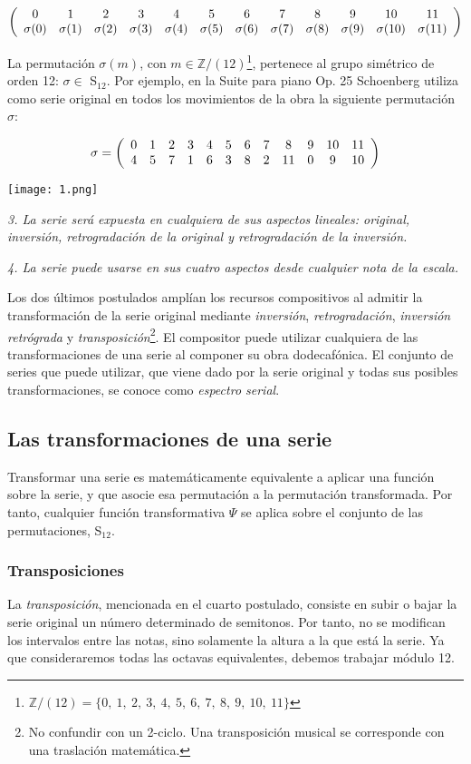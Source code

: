 		\[
			\drow{
				\sigma(0),\sigma(1),\sigma(2),\sigma(3),\sigma(4),\sigma(5),\sigma(6),\sigma(7),\sigma(8),\sigma(9),\sigma(10),\sigma(11)
			}
		\]
	
		La permutaci\'on $\sigma(m)$, con $m\in \mathbb{Z} / (12)$\footnote{$\mathbb{Z} / (12)=\{0,\ 1,\ 2,\ 3,\ 4,\ 5,\ 6,\ 7,\ 8,\ 9,\ 10,\ 11\}$}, pertenece al grupo sim\'etrico de orden 12: $\sigma\in$ S$_{12}$. Por ejemplo, en la Suite para piano Op. 25 Schoenberg utiliza como serie original en todos los movimientos de la obra la siguiente permutaci\'on $\sigma$:
		
		\[\sigma=\drow{4,5,7,1,6,3,8,2,11,0,9,10}\]	
		\begin{center}
			\texttt{[image: 1.png]}
		\end{center}
		
		\emph{3. La serie ser\'a expuesta en cualquiera de sus aspectos lineales: original, inversi\'on, retrogradaci\'on de la original y retrogradaci\'on de la inversi\'on.}
		 
		\emph{4. La serie puede usarse en sus cuatro aspectos desde cualquier nota de la escala.}
		
		Los dos \'ultimos postulados ampl\'ian los recursos compositivos al admitir la transformaci\'on de la serie original mediante \emph{inversi\'on}, \emph{retrogradaci\'on}, \emph{inversi\'on retr\'ograda} y \emph{transposici\'on}\footnote{No confundir con un 2-ciclo. Una transposici\'on musical se corresponde con una traslaci\'on matem\'atica.}. El compositor puede utilizar cualquiera de las transformaciones de una serie al componer su obra dodecaf\'onica. El conjunto de series que puede utilizar, que viene dado por la serie original y todas sus posibles transformaciones, se conoce como \emph{espectro serial}. \cite{dominguez}
		
	\subsection{Las transformaciones de una serie}
		\label{transPsi}
		Transformar una serie es matem\'aticamente equivalente a aplicar una funci\'on sobre la serie, y que asocie esa permutaci\'on a la permutaci\'on transformada. Por tanto, cualquier funci\'on transformativa $\Psi$ se aplica sobre el conjunto de las permutaciones, S$_{12}$.
		
	\subsubsection{Transposiciones}
		La \emph{transposici\'on}, mencionada en el cuarto postulado, consiste en subir o bajar la serie original un n\'umero determinado de semitonos. Por tanto, no se modifican los intervalos entre las notas, sino solamente la altura a la que est\'a la serie. Ya que consideraremos todas las octavas equivalentes, debemos trabajar m\'odulo 12. 
		
